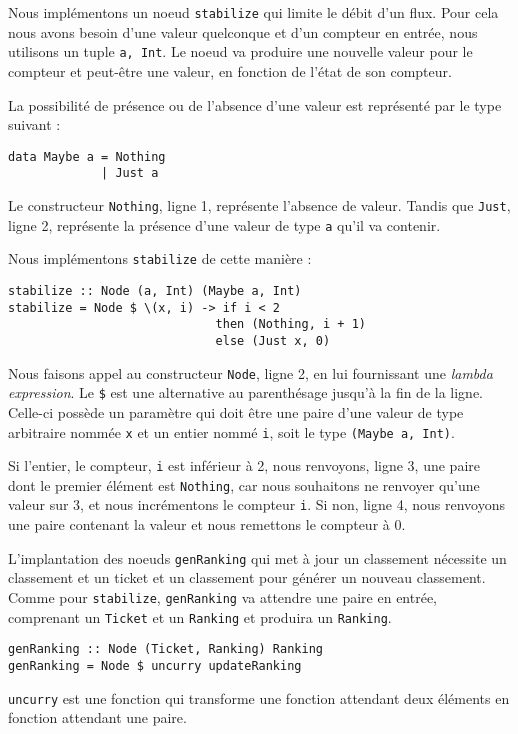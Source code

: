 \documentclass{llncs}
\begin{document}
Nous implémentons un noeud \lstinline{stabilize} qui limite le débit d'un flux.
Pour cela nous avons besoin d'une valeur quelconque et d'un compteur en entrée,
nous utilisons un tuple \lstinline{a, Int}.
Le noeud va produire une nouvelle valeur pour le compteur et peut-être une valeur,
en fonction de l'état de son compteur.

La possibilité de présence ou de l'absence d'une valeur est représenté par le type
suivant :

\begin{lstlisting}
data Maybe a = Nothing
             | Just a
\end{lstlisting}

Le constructeur \lstinline{Nothing}, ligne 1, représente l'absence de valeur.
Tandis que \lstinline{Just}, ligne 2, représente la présence d'une valeur de type
\lstinline{a} qu'il va contenir.

Nous implémentons \lstinline{stabilize} de cette manière :
\begin{lstlisting}
stabilize :: Node (a, Int) (Maybe a, Int)
stabilize = Node $ \(x, i) -> if i < 2
                             then (Nothing, i + 1)
                             else (Just x, 0)
\end{lstlisting}

Nous faisons appel au constructeur \lstinline{Node}, ligne 2, en lui fournissant
une \emph{lambda expression}.
Le \lstinline{$} est une alternative au parenthésage jusqu'à la fin de la ligne.
Celle-ci possède un paramètre qui doit être une paire d'une valeur de type arbitraire
nommée \lstinline{x} et un entier nommé \lstinline{i}, soit le type
\lstinline{(Maybe a, Int)}.

Si l'entier, le compteur, \lstinline{i} est inférieur à 2, nous renvoyons, ligne 3,
une paire dont le premier élément est \lstinline{Nothing}, car nous souhaitons
ne renvoyer qu'une valeur sur 3, et nous incrémentons le compteur \lstinline{i}.
Si non, ligne 4, nous renvoyons une paire contenant la valeur et nous remettons
le compteur à 0.

L'implantation des noeuds \lstinline{genRanking} qui met à jour un classement
nécessite un classement et un ticket et un classement pour générer un nouveau classement.
Comme pour \lstinline{stabilize}, \lstinline{genRanking} va attendre une paire en
entrée, comprenant un \lstinline{Ticket} et un \lstinline{Ranking} et produira
un \lstinline{Ranking}.
\begin{lstlisting}
genRanking :: Node (Ticket, Ranking) Ranking
genRanking = Node $ uncurry updateRanking
\end{lstlisting}
\lstinline{uncurry} est une fonction qui transforme une fonction attendant deux éléments
en fonction attendant une paire.
\end{document}
